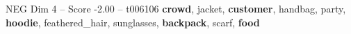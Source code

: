 \begin{textsample}{NEG Dim 4 – Score -2.00 – t006106}  \label{ex:f4_neg_037}
\textbf{crowd}, jacket, \textbf{customer}, handbag, party, \textbf{hoodie}, feathered\_hair, sunglasses, \textbf{backpack}, scarf, \textbf{food}

\end{textsample}
